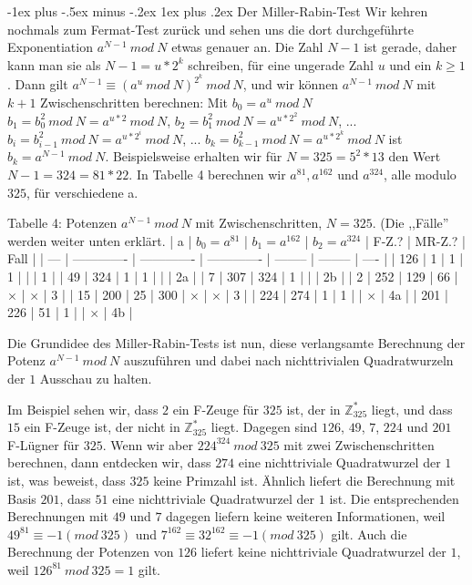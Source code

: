 \documentclass[a4paper]{article}
\makeatletter
\renewcommand{\subsubsection}{\@startsection{subsubsection}{3}{0mm}%
 {-1ex plus -.5ex minus -.2ex}%
 {1ex plus .2ex}%
 {\normalfont\small\bfseries}}
\makeatother
\begin{document}
\begin{multicols}{3}
        \subsubsection{Der Miller-Rabin-Test}
        Wir kehren nochmals zum Fermat-Test zurück und sehen uns die dort durchgeführte Exponentiation $a^{N-1}\ mod\ N$ etwas genauer an. Die Zahl $N-1$ ist gerade, daher kann man sie als $N-1=u*2^k$ schreiben, für eine ungerade Zahl $u$ und ein $k\geq 1$. Dann gilt $a^{N-1} \equiv (a^u\ mod\ N)^{2^k}\ mod\ N$, und wir können $a^{N-1}\ mod\ N$ mit $k+1$ Zwischenschritten berechnen: Mit
    $b_0 =a^u\ mod\ N$
    $b_1 =b^2_0\ mod\ N=a^{u*2}\ mod\ N$,
    $b_2 =b^2_1\ mod\ N=a^{u*2^2}\ mod\ N$,
        ...
    $b_i=b^2_{i-1}\ mod\ N=a^{u*2^i}\ mod\ N$,
        ...
    $b_k=b^2_{k-1}\ mod\ N=a^{u*2^k}\ mod\ N$
        ist $b_k=a^{N-1}\ mod\ N$. Beispielsweise erhalten wir für $N=325 = 5^2 *13$ den Wert $N-1 = 324 = 81* 22$. In Tabelle 4 berechnen wir $a^{81} ,a^{162}$ und $a^{324}$, alle modulo $325$, für verschiedene a.

        Tabelle 4: Potenzen $a^{N-1}\ mod\ N$ mit Zwischenschritten, $N=325$. (Die ,,Fälle'' werden weiter unten erklärt.
        | a   | $b_0 =a^{81}$ | $b_1=a^{162}$ | $b_2=a^{324}$ | F-Z.?    | MR-Z.?   | Fall |
        | --- | ------------- | ------------- | ------------- | -------- | -------- | ---- |
        | 126 | 1             | 1             | 1             |          |          | 1    |
        | 49  | 324           | 1             | 1             |          |          | 2a   |
        | 7   | 307           | 324           | 1             |          |          | 2b   |
        | 2   | 252           | 129           | 66            | $\times$ | $\times$ | 3    |
        | 15  | 200           | 25            | 300           | $\times$ | $\times$ | 3    |
        | 224 | 274           | 1             | 1             |          | $\times$ | 4a   |
        | 201 | 226           | 51            | 1             |          | $\times$ | 4b   |

        Die Grundidee des Miller-Rabin-Tests ist nun, diese verlangsamte Berechnung der Potenz $a^{N-1}\ mod\ N$ auszuführen und dabei nach nichttrivialen Quadratwurzeln der $1$ Ausschau zu halten.

        Im Beispiel sehen wir, dass $2$ ein F-Zeuge für $325$ ist, der in $\mathbb{Z}^*_{325}$ liegt, und dass $15$ ein F-Zeuge ist, der nicht in $\mathbb{Z}^*_{325}$ liegt. Dagegen sind $126$, $49$, $7$, $224$ und $201$ F-Lügner für $325$. Wenn wir aber $224^{324}\ mod\ 325$ mit zwei Zwischenschritten berechnen, dann entdecken wir, dass $274$ eine nichttriviale Quadratwurzel der $1$ ist, was beweist, dass $325$ keine Primzahl ist. Ähnlich liefert die Berechnung mit Basis $201$, dass $51$ eine nichttriviale Quadratwurzel der $1$ ist. Die entsprechenden Berechnungen mit $49$ und $7$ dagegen liefern keine weiteren Informationen, weil $49^{81} \equiv -1 (mod\ 325)$ und $7^{162} \equiv 32^{162} \equiv -1 (mod\ 325)$ gilt. Auch die Berechnung der Potenzen von $126$ liefert keine nichttriviale Quadratwurzel der $1$, weil $126^{81}\ mod\ 325 = 1$ gilt.


\end{multicols}
\end{document}
